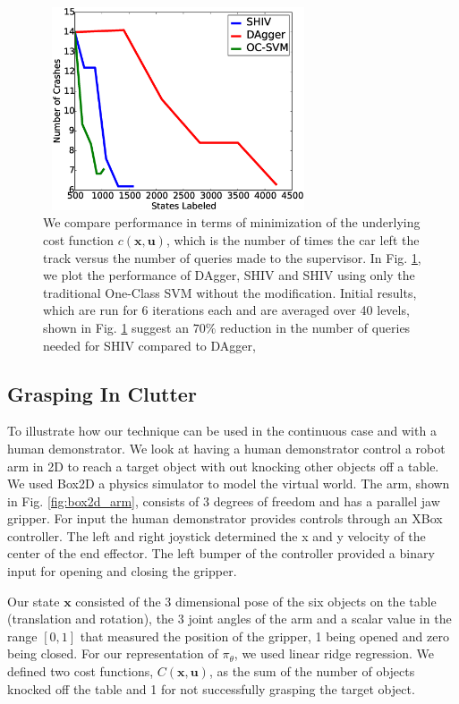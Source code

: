 \documentclass[10pt, conference]{ieeeconf}      %
\newcommand{\bu}{\mathbf{u}}
\newcommand{\bx}{\mathbf{x}}
\begin{document}
\begin{figure}[t!]
\centering
\includegraphics[width=8cm, height=6cm]{figures/dagger_shiv_one_class.eps}
\caption{We compare performance in terms of minimization of the underlying cost function $c(\bx,\bu)$, which is the  number of times the car left the track versus the number of queries made to the supervisor. In Fig. \ref{fig:car_cost}, we plot the performance of DAgger, SHIV and SHIV using only the traditional One-Class SVM without the modification.  Initial results, which are run for 6 iterations each and are averaged over 40 levels, shown in Fig. \ref{fig:car_cost} suggest an $70\%$ reduction in the number of queries needed for SHIV compared to DAgger,}
\vspace*{-10pt}
\label{fig:car_cost}
\end{figure}


\subsection{Grasping In Clutter}
To illustrate how our technique can be used in the continuous case and with a human demonstrator. 
We look at having a human demonstrator control a robot arm in 2D to reach a target object with out knocking other objects off a table. We used Box2D a physics simulator to model the virtual world. The arm, shown in Fig. \ref{fig:box2d_arm}, consists of 3 degrees of freedom and has a parallel jaw gripper. For input the human demonstrator provides controls through an XBox controller. The left and right joystick determined the x and y velocity of the center of the end effector. The left bumper of the controller provided a binary input for opening and closing the gripper. 

Our state $\bx$ consisted of the 3 dimensional pose of the six objects on the table (translation and rotation), the 3 joint angles of the arm and a scalar value in the range $[0,1]$ that measured the position of the gripper, 1 being opened and zero being closed. For our representation of $\pi_{\theta}$, we used linear ridge regression. We defined two cost functions, $C(\bx,\bu)$, as the sum of the number of objects knocked off the table and 1 for not successfully grasping the target object. 
\end{document}
